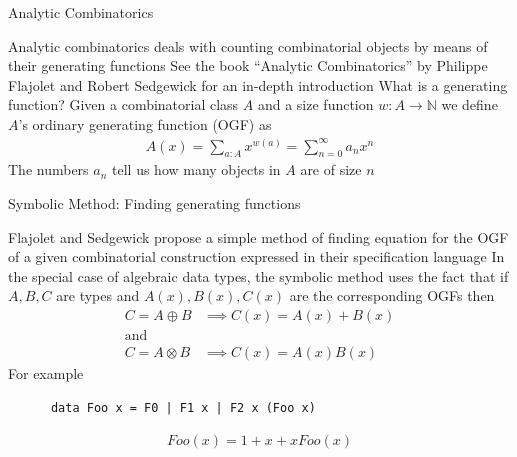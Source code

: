 \documentclass[pdf]{beamer}
\begin{document}
\begin{frame}{Analytic Combinatorics}
  \begin{outline}
    \1 Analytic combinatorics deals with counting combinatorial objects by means of their generating functions
    \pause
    \2 See the book ``Analytic Combinatorics'' by Philippe Flajolet and Robert Sedgewick for an in-depth introduction
    \pause
    \1 What is a generating function?
    \pause
    \1 Given a combinatorial class $A$ and a size function $w : A \to \mathbb{N}$ we define $A$'s ordinary generating function (OGF) as
    \begin{align*}
      A(x) = \sum_{a : A}{x^{w(a)}} = \sum_{n=0}^{\infty}{a_n x^n}
    \end{align*}
    \pause
    \1 The numbers $a_n$ tell us how many objects in $A$ are of size $n$
  \end{outline}
\end{frame}

\begin{frame}[fragile]{Symbolic Method: Finding generating functions}
  \begin{outline}
    \1 Flajolet and Sedgewick propose a simple method of finding equation for the OGF of a given combinatorial construction expressed in their specification language
    \pause
    \1 In the special case of algebraic data types, the symbolic method uses the fact that if $A, B, C$ are types and $A(x), B(x), C(x)$ are the corresponding OGFs then
    \begin{align*}
      C = A \oplus B &\implies C(x) = A(x) + B(x) \\
    \text{and} \\
      C = A \otimes B &\implies C(x) = A(x) B(x)
    \end{align*}
    \pause
    \1 For example
    \begin{verbatim}
      data Foo x = F0 | F1 x | F2 x (Foo x)
    \end{verbatim}
    \pause
    \begin{align*}
      Foo(x) = 1 + x + x Foo(x)
    \end{align*}
  \end{outline}
\end{frame}
\end{document}
